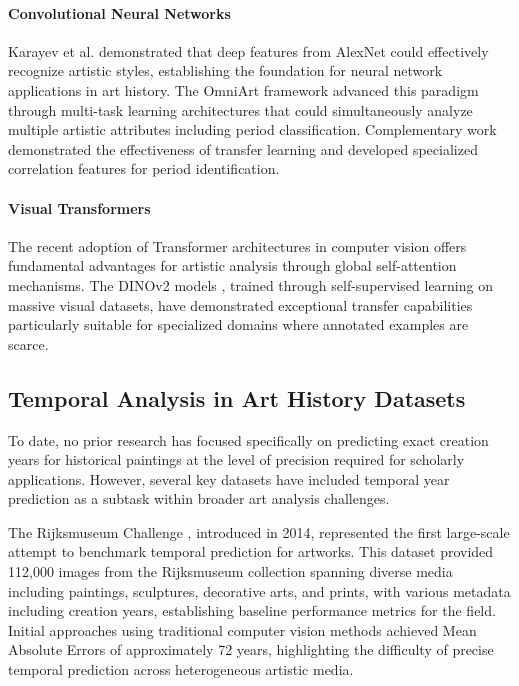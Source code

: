 \documentclass[10pt,twocolumn,letterpaper]{article}
\begin{document}
\paragraph{Convolutional Neural Networks} Karayev et al. \cite{Karayev14} demonstrated that deep features from AlexNet could effectively recognize artistic styles, establishing the foundation for neural network applications in art history. The OmniArt framework \cite{Strezoski17OmniArt, Strezoski18} advanced this paradigm through multi-task learning architectures that could simultaneously analyze multiple artistic attributes including period classification. Complementary work demonstrated the effectiveness of transfer learning \cite{Crowley16Detection, Mao17} and developed specialized correlation features for period identification\cite{Chu18}.

\paragraph{Visual Transformers} The recent adoption of Transformer architectures in computer vision offers fundamental advantages for artistic analysis through global self-attention mechanisms. The DINOv2 models \cite{Oquab23}, trained through self-supervised learning on massive visual datasets, have demonstrated exceptional transfer capabilities particularly suitable for specialized domains where annotated examples are scarce.

\subsection{Temporal Analysis in Art History Datasets}

To date, no prior research has focused specifically on predicting exact creation years for historical paintings at the level of precision required for scholarly applications. However, several key datasets have included temporal year prediction as a subtask within broader art analysis challenges.

The Rijksmuseum Challenge \cite{Mensink14}, introduced in 2014, represented the first large-scale attempt to benchmark temporal prediction for artworks. This dataset provided 112,000 images from the Rijksmuseum collection spanning diverse media including paintings, sculptures, decorative arts, and prints, with various metadata including creation years, establishing baseline performance metrics for the field. Initial approaches using traditional computer vision methods achieved Mean Absolute Errors of approximately 72 years, highlighting the difficulty of precise temporal prediction across heterogeneous artistic media.
\end{document}
